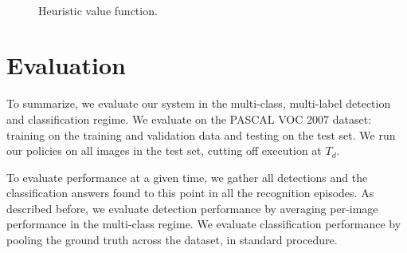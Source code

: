 \begin{figure}[h!]
\centering
{} \\
  \caption{Heuristic value function.}
  \label{fig:results_manual}
\end{figure}

\section{Evaluation} \label{sec:evaluation}

To summarize, we evaluate our system in the multi-class, multi-label detection and classification regime.
We evaluate on the PASCAL VOC 2007 dataset: training on the training and validation data and testing on the test set.
We run our policies on all images in the test set, cutting off execution at $T_d$.

To evaluate performance at a given time, we gather all detections and the classification answers found to this point in all the recognition episodes.
As described before, we evaluate detection performance by averaging per-image performance in the multi-class regime.
We evaluate classification performance by pooling the ground truth across the dataset, in standard procedure.

